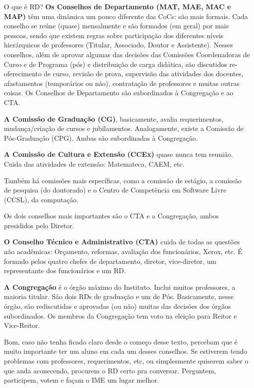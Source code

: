 \begin{secao}{O que é RD?}
{\bf Os Conselhos de Departamento (MAT, MAE, MAC e MAP)} têm uma dinâmica um
pouco diferente das CoCs: são mais formais. Cada conselho se reúne (quase)
mensalmente e são formados (em geral) por mais pessoas, sendo que existem
regras sobre participação dos diferentes níveis hierárquicos de
professores (Titular, Associado, Doutor e Assistente). Nesses conselhos, além
de aprovar algumas das decisões das Comissões Coordenadoras de Curso e de
Programa (pós) e distribuição de carga didática, são discutidos re-oferecimento
de curso, revisão de prova, supervisão das atividades dos docentes,
afastamentos (temporários ou não), contratação de professores e muitas outras
coisas.
Os Conselhos de Departamento são subordinados à Congregação e ao CTA.

{\bf A Comissão de Graduação (CG)}, basicamente, avalia requerimentos,
mudança/criação de cursos e jubilamentos. Analogamente, existe a Comissão de
Pós-Graduação (CPG). Ambas são subordinadas à Congregação.

{\bf A Comissão de Cultura e Extensão (CCEx)} quase nunca tem reunião. Cuida
das atividades de extensão: Matemateca, CAEM, etc.

Também há comissões mais específicas, como a comissão de estágio, a comissão de 
pesquisa (do doutorado) e o Centro de Competência em Software Livre (CCSL), da computação.

Os dois conselhos mais importantes são o CTA e a Congregação, ambos presididos
pelo Diretor.

{\bf O Conselho Técnico e Administrativo (CTA)} cuida de todas as questões não
acadêmicas: Orçamento, reformas, avaliação dos funcionários, Xerox, etc. É 
formado pelos quatro chefes de departamento, diretor, vice-diretor, um
representante dos funcionários e um RD.

{\bf A Congregação} é o órgão máximo do Instituto. Inclui muitos professores, a
maioria titular. São dois RDs de graduação e um de Pós. Basicamente,
nesse órgão, são rediscutidas e aprovadas (ou não) muitas das decisões
dos órgãos subordinados. Os membros da Congregação tem voto na eleição para
Reitor e Vice-Reitor.


Bom, caso não tenha ficado claro desde o começo desse texto, percebam que é 
muito importante ter um aluno em cada um desses conselhos. Se estiverem tendo 
problemas com professores, requerimentos, etc, ou simplesmente quiserem saber 
o que anda aconecendo, procurem o RD certo pra conversar. Perguntem, participem, 
votem e façam o IME um lugar melhor.

\end{secao}
